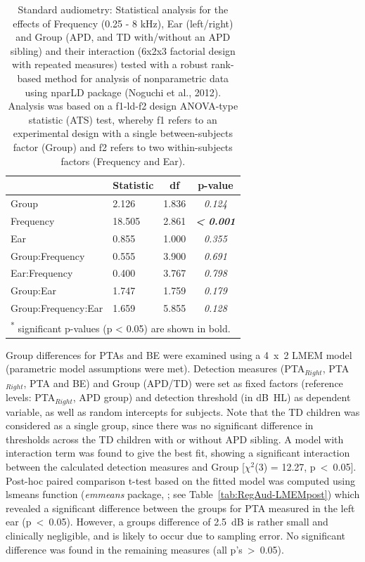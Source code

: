 \documentclass[a4paper, twoside]{templates/ociamthesis}
\begin{document}
\begin{table}

\caption{\label{tab:RegAud-TabnparLD}Standard audiometry: Statistical analysis for the effects of Frequency (0.25 - 8 kHz), Ear (left/right) and Group (APD, and TD with/without an APD sibling) and their interaction (6x2x3 factorial design with repeated measures) tested with a robust rank-based method for analysis of nonparametric data using nparLD package (Noguchi et al., 2012). Analysis was based on a f1-ld-f2 design ANOVA-type statistic (ATS) test, whereby f1 refers to an experimental design with a single between-subjects factor (Group) and f2 refers to two within-subjects factors (Frequency and Ear).}
\centering
\begin{tabular}[t]{llc>{}c}
\toprule
  & Statistic & df & p-value\\
\midrule
Group & 2.126 & 1.836 & \em{0.124}\\
Frequency & 18.505 & 2.861 & \em{\textbf{< 0.001}}\\
Ear & 0.855 & 1.000 & \em{0.355}\\
Group:Frequency & 0.555 & 3.900 & \em{0.691}\\
Ear:Frequency & 0.400 & 3.767 & \em{0.798}\\
Group:Ear & 1.747 & 1.759 & \em{0.179}\\
Group:Frequency:Ear & 1.659 & 5.855 & \em{0.128}\\
\bottomrule
\multicolumn{4}{l}{\textsuperscript{*} significant p-values (p < 0.05) are shown in bold.}\\
\end{tabular}
\end{table}

Group differences for PTAs and BE were examined using a 4~x~2 LMEM model (parametric model assumptions were met). Detection measures (PTA\(_{Right}\), PTA\(_{Right}\), PTA and BE) and Group (APD/TD) were set as fixed factors (reference levels: PTA\(_{Right}\), APD group) and detection threshold (in dB~HL) as dependent variable, as well as random intercepts for subjects. Note that the TD children was considered as a single group, since there was no significant difference in thresholds across the TD children with or without APD sibling. A model with interaction term was found to give the best fit, showing a significant interaction between the calculated detection measures and Group {[}\(\chi^2\)(3) = 12.27, p~\textless~0.05{]}. Post-hoc paired comparison t-test based on the fitted model was computed using lsmeans function (\emph{emmeans} package, \textcite{emmeansPackageR}; see Table~\ref{tab:RegAud-LMEMpost}) which revealed a significant difference between the groups for PTA measured in the left ear (p~\textless~0.05). However, a groups difference of 2.5~dB is rather small and clinically negligible, and is likely to occur due to sampling error. No significant difference was found in the remaining measures (all p's~\textgreater~0.05).\\
\end{document}
